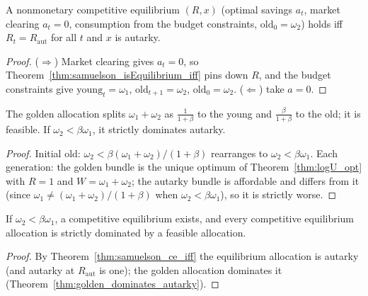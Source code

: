 \begin{theorem}
\label{thm:samuelson_ce_iff}
\leanok
{}
A nonmonetary competitive equilibrium $(R, x)$ (optimal savings $a_t$, market clearing $a_t = 0$, consumption
from the budget constraints, $\mathrm{old}_0 = \omega_2$) holds iff $R_t = R_{\mathrm{aut}}$ for all $t$ and $x$ is autarky.
\end{theorem}
\begin{proof}
\leanok
($\Rightarrow$) Market clearing gives $a_t = 0$, so Theorem~\ref{thm:samuelson_isEquilibrium_iff} pins down $R$, and the
budget constraints give $\mathrm{young}_t = \omega_1$, $\mathrm{old}_{t+1} = \omega_2$, $\mathrm{old}_0 = \omega_2$.
($\Leftarrow$) take $a = 0$.
\end{proof}

\begin{theorem}
\label{thm:golden_dominates_autarky}
\leanok
{}
The golden allocation splits $\omega_1 + \omega_2$ as $\frac{1}{1+\beta}$ to the young and $\frac{\beta}{1+\beta}$ to the old;
it is feasible. If $\omega_2 < \beta\omega_1$, it strictly dominates autarky.
\end{theorem}
\begin{proof}
\leanok
Initial old: $\omega_2 < \beta(\omega_1 + \omega_2)/(1+\beta)$ rearranges to $\omega_2 < \beta\omega_1$. Each generation: the
golden bundle is the unique optimum of Theorem~\ref{thm:logU_opt} with $R = 1$ and $W = \omega_1 + \omega_2$; the autarky
bundle is affordable and differs from it (since $\omega_1 \neq (\omega_1 + \omega_2)/(1+\beta)$ when $\omega_2 < \beta\omega_1$),
so it is strictly worse.
\end{proof}

\begin{theorem}
\label{thm:firstWelfareTheorem_fails}
\leanok
{}
If $\omega_2 < \beta\omega_1$, a competitive equilibrium exists, and every competitive equilibrium allocation is strictly
dominated by a feasible allocation.
\end{theorem}
\begin{proof}
\leanok
By Theorem~\ref{thm:samuelson_ce_iff} the equilibrium allocation is autarky (and autarky at $R_{\mathrm{aut}}$ is one);
the golden allocation dominates it (Theorem~\ref{thm:golden_dominates_autarky}).
\end{proof}

